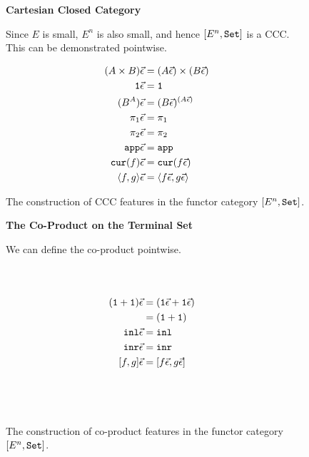 \begin{figure}
    \begin{minipage}{0.47\linewidth}
        \begin{framed}
            \centering\textbf{Cartesian Closed Category}
    
    Since $E$ is small, $E^n$ is also small, and hence $[E^n, \texttt{Set}]$ is a CCC. This can be demonstrated pointwise.
    
    \begin{align*}
        (A\times B)\vec{\epsilon} & = (A\vec{\epsilon})\times(B\vec{\epsilon})\\
        \texttt{1}\vec{\epsilon} & = \texttt{1}\\
        (B^A)\vec{\epsilon} &= (B\vec{\epsilon})^{(A\vec{\epsilon})}\\
        \pi_1\vec{\epsilon} & = \pi_1\\
        \pi_2\vec{\epsilon} & = \pi_2\\
        \texttt{app}\vec{\epsilon} & = \texttt{app}\\
        \texttt{cur}(f)\vec{\epsilon} & = \texttt{cur}(f\vec{\epsilon})\\
        \langle f, g\rangle\vec{\epsilon} & = \langle f\vec{\epsilon}, g\vec{\epsilon}\rangle\\
    \end{align*}
    
    \end{framed}
    \caption{The construction of CCC features in the functor category $[E^n, \texttt{Set}]$.}
    \label{HowToBuildCCC}
    \end{minipage}
    \quad\begin{minipage}{0.47\linewidth}
        \begin{framed}
            \centering\textbf{The Co-Product on the Terminal Set}
        
        We can define the co-product pointwise.
        
        \begin{align*}
            \\ \\
            (\texttt{1} + \texttt{1})\vec{\epsilon} & = (\texttt{1}\vec{\epsilon} + \texttt{1}\vec{\epsilon})\\
            & = (\texttt{1} + \texttt{1})\\
            \texttt{inl}\vec{\epsilon} &= \texttt{inl}\\
            \texttt{inr}\vec{\epsilon} &= \texttt{inr}\\
            [f, g]\vec{\epsilon} &= [f\vec{\epsilon}, g\vec{\epsilon}]\\
            \\ \\ \\ 
        \end{align*}
        \end{framed}
        \caption{The construction of co-product features in the functor category $[E^n, \texttt{Set}]$.}
        \label{HowToBuildCoproduct}
    \end{minipage}
    
\end{figure}

